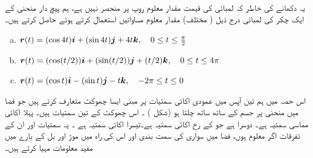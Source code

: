 \\
یہ دکھانے کی خاطر کہ لمبائی کی قیمت مقدار معلوم روپ پر منحصر نہیں ہے، ہم  پیچ دار منحنی کے ایک چکر کی لمبائی درج  ذیل ( مختلف) مقدار معلوم مساواتیں استعمال کرتے ہوئے حاصل کرتے ہیں۔
\begin{enumerate}[a.]
\item
${{\boldsymbol{r}}}(t)=(\cos 4t){\boldsymbol{i}}+(\sin 4t){\boldsymbol{j}}+4t{\boldsymbol{k}},\quad 0\le t\le \tfrac{\pi}{2}$
\item
${{\boldsymbol{r}}}(t)=(\cos (t/2)){\boldsymbol{i}}+(\sin (t/2)){\boldsymbol{j}}+(t/2){\boldsymbol{k}},\quad 0\le t\le 4\pi$
\item
${{\boldsymbol{r}}}(t)=(\cos t){\boldsymbol{i}}-(\sin t){\boldsymbol{j}}-t{\boldsymbol{k}},\quad -2\pi \le t\le 0$
\end{enumerate}


اس حصہ میں ہم   تین آپس میں عمودی اکائی سمتیات پر مبنی ایسا چھوکٹ متعارف کرتے ہیں جو  فضا میں منحنی پر جسم کے ساتھ ساتھ چلتا ہو (شکل ) ۔ اس چھوکٹ کے تین سمتیات  ہیں۔ پہلا  اکائی مماسی سمتیہ  ہے۔ دوسرا  ہے جو   کے رخ اکائی سمتیہ ہے۔تیسرا اکائی سمتیہ   ہے ۔ یہ سمتیات اور ان کے تفرقات  اگر معلوم ہوں، فضا  میں سواری  کی  سمت بندی اور اس کی راہ  میں موڑ  اور بل  کے بارے میں مفید معلومات   مہیا کرتے ہیں۔

